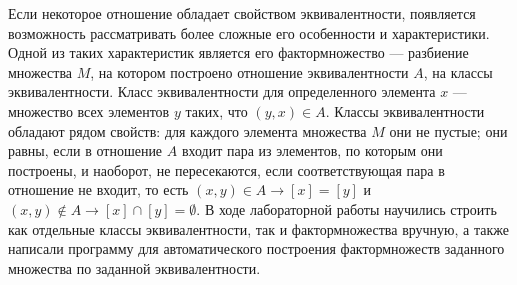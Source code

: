 \documentclass[12pt]{article}
\begin{document}
	Если некоторое отношение обладает свойством эквивалентности, появляется возможность рассматривать более сложные его особенности и характеристики. Одной из таких характеристик является его фактормножество --- разбиение множества $M$, на котором построено отношение эквивалентности $A$, на классы эквивалентности. Класс эквивалентности для определенного элемента $x$ --- множество всех элементов $y$ таких, что $(y, x) \in A$. Классы эквивалентности обладают рядом свойств: для каждого элемента множества $M$ они не пустые; они равны, если в отношение $A$ входит пара из элементов, по которым они построены, и наоборот, не пересекаются, если соответствующая пара в отношение не входит, то есть $(x, y) \in A \to [x] = [y]$ и $(x, y) \notin A \to [x] \cap [y] = \emptyset$. В ходе лабораторной работы научились строить как отдельные классы эквивалентности, так и фактормножества вручную, а также написали программу для автоматического построения фактормножеств заданного множества по заданной эквивалентности.
\end{document}
